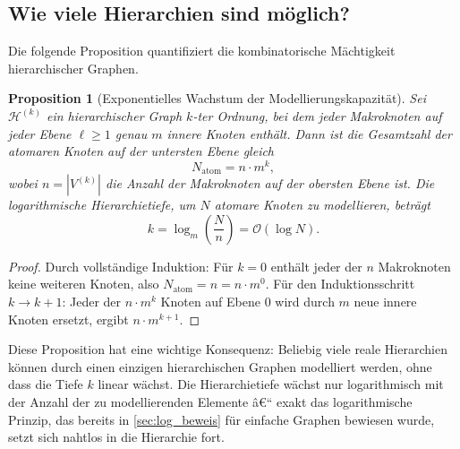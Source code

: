 ﻿\documentclass[12pt,a4paper,twoside]{article}
\theoremstyle{definition}
\theoremstyle{plain}
\newtheorem{proposition}[theorem]{Proposition}
\theoremstyle{remark}
\begin{document}
\subsection{Wie viele Hierarchien sind möglich?}
\label{sub:kapazitaet}

Die folgende Proposition quantifiziert die kombinatorische Mächtigkeit
hierarchischer Graphen.

\begin{proposition}[Exponentielles Wachstum der Modellierungskapazität]
	\label{prop:wachstum}
	Sei $\mathcal{H}^{(k)}$ ein hierarchischer Graph $k$-ter Ordnung,
	bei dem jeder Makroknoten auf jeder Ebene $\ell \geq 1$ genau
	$m$ innere Knoten enthält.  Dann ist die Gesamtzahl der atomaren
	Knoten auf der untersten Ebene gleich
	\[
	N_{\text{atom}} = n \cdot m^k,
	\]
	wobei $n = |V^{(k)}|$ die Anzahl der Makroknoten auf der obersten
	Ebene ist.  Die logarithmische Hierarchietiefe, um $N$ atomare Knoten
	zu modellieren, beträgt
	\[
	k = \log_m\!\left(\frac{N}{n}\right) = \mathcal{O}(\log N).
	\]
\end{proposition}

\begin{proof}
	Durch vollständige Induktion: Für $k=0$ enthält jeder der $n$
	Makroknoten keine weiteren Knoten, also $N_{\text{atom}} = n = n \cdot m^0$.
	Für den Induktionsschritt $k \to k+1$: Jeder der $n \cdot m^k$ Knoten
	auf Ebene 0 wird durch $m$ neue innere Knoten ersetzt, ergibt
	$n \cdot m^{k+1}$.\qquad
\end{proof}

\noindent
Diese Proposition hat eine wichtige Konsequenz: Beliebig viele
reale Hierarchien können durch einen einzigen hierarchischen Graphen
modelliert werden, ohne dass die Tiefe $k$ linear wächst.  Die
Hierarchietiefe wächst nur logarithmisch mit der Anzahl der
zu modellierenden Elemente â€“ exakt das logarithmische Prinzip,
das bereits in \cref{sec:log_beweis} für einfache Graphen bewiesen
wurde, setzt sich nahtlos in die Hierarchie fort.
\end{document}
